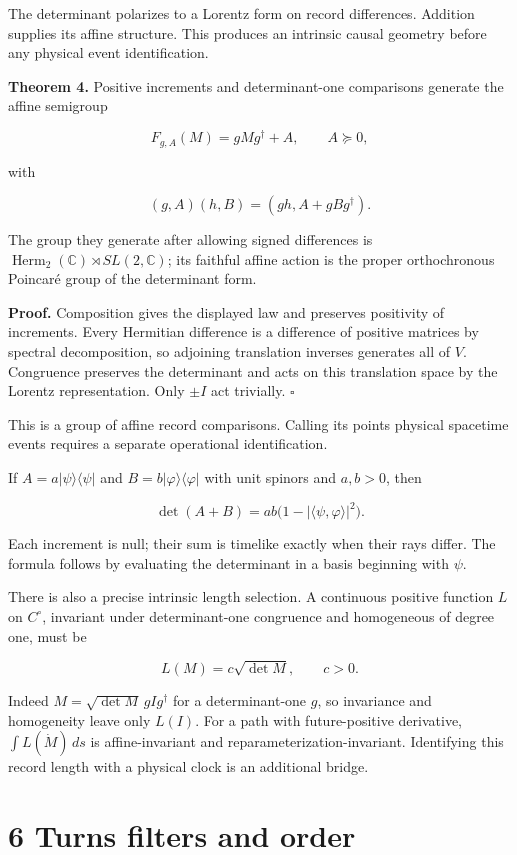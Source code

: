 \documentclass[
  11pt,
  a4paper,
]{article}
\begin{document}
The determinant polarizes to a Lorentz form on record differences. Addition supplies its affine structure. This produces an intrinsic causal geometry before any physical event identification.

\textbf{Theorem 4.} Positive increments and determinant-one comparisons generate the affine semigroup

\[F_{g,A}(M)=gMg^\dagger+A,\qquad A\succeq0,\]

with

\[(g,A)(h,B)=(gh,A+gBg^\dagger).\]

The group they generate after allowing signed differences is \(\operatorname{Herm}_2(\mathbb C)\rtimes SL(2,\mathbb C)\); its faithful affine action is the proper orthochronous Poincaré group of the determinant form.

\textbf{Proof.} Composition gives the displayed law and preserves positivity of increments. Every Hermitian difference is a difference of positive matrices by spectral decomposition, so adjoining translation inverses generates all of \(V\). Congruence preserves the determinant and acts on this translation space by the Lorentz representation. Only \(\pm I\) act trivially. \(\square\)

This is a group of affine record comparisons. Calling its points physical spacetime events requires a separate operational identification.

If \(A=a|\psi\rangle\langle\psi|\) and \(B=b|\varphi\rangle\langle\varphi|\) with unit spinors and \(a,b>0\), then

\[\det(A+B)=ab\bigl(1-|\langle\psi,\varphi\rangle|^2\bigr).\]

Each increment is null; their sum is timelike exactly when their rays differ. The formula follows by evaluating the determinant in a basis beginning with \(\psi\).

There is also a precise intrinsic length selection. A continuous positive function \(L\) on \(C^\circ\), invariant under determinant-one congruence and homogeneous of degree one, must be

\[L(M)=c\sqrt{\det M},\qquad c>0.\]

Indeed \(M=\sqrt{\det M}\,gIg^\dagger\) for a determinant-one \(g\), so invariance and homogeneity leave only \(L(I)\). For a path with future-positive derivative, \(\int L(\dot M)\,ds\) is affine-invariant and reparameterization-invariant. Identifying this record length with a physical clock is an additional bridge.

\section{6 Turns filters and order}\label{turns-filters-and-order}
\end{document}
